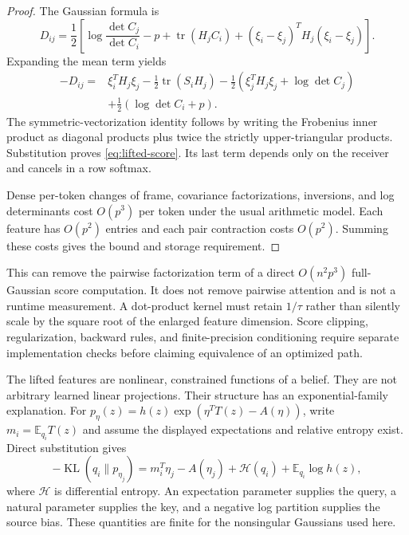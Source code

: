 \documentclass[11pt]{article}
\newcommand{\E}{\mathbb{E}}
\newcommand{\KL}{\operatorname{KL}}
\newcommand{\tr}{\operatorname{tr}}
\begin{document}
\begin{proof}
The Gaussian formula is
\begin{equation}
D_{ij}=\frac12\left[\log\frac{\det C_j}{\det C_i}-p+
\tr(H_jC_i)+(\xi_i-\xi_j)^TH_j(\xi_i-\xi_j)\right].
\end{equation}
Expanding the mean term yields
\begin{align}
-D_{ij}={}&\xi_i^TH_j\xi_j-\frac12\tr(S_iH_j)
-\frac12(\xi_j^TH_j\xi_j+\log\det C_j)\nonumber\\
&+\frac12(\log\det C_i+p).
\label{eq:expanded-gaussian}
\end{align}
The symmetric-vectorization identity follows by writing the Frobenius inner product as diagonal products plus twice the strictly upper-triangular products. Substitution proves \eqref{eq:lifted-score}. Its last term depends only on the receiver and cancels in a row softmax.

Dense per-token changes of frame, covariance factorizations, inversions, and log determinants cost $O(p^3)$ per token under the usual arithmetic model. Each feature has $O(p^2)$ entries and each pair contraction costs $O(p^2)$. Summing these costs gives the bound and storage requirement.
\end{proof}

This can remove the pairwise factorization term of a direct $O(n^2p^3)$ full-Gaussian score computation. It does not remove pairwise attention and is not a runtime measurement. A dot-product kernel must retain $1/\tau$ rather than silently scale by the square root of the enlarged feature dimension. Score clipping, regularization, backward rules, and finite-precision conditioning require separate implementation checks before claiming equivalence of an optimized path.

The lifted features are nonlinear, constrained functions of a belief. They are not arbitrary learned linear projections. Their structure has an exponential-family explanation. For $p_\eta(z)=h(z)\exp(\eta^TT(z)-A(\eta))$, write $m_i=\E_{q_i}T(z)$ and assume the displayed expectations and relative entropy exist. Direct substitution gives
\begin{equation}
-\KL(q_i\|p_{\eta_j})=m_i^T\eta_j-A(\eta_j)+\mathcal H(q_i)+\E_{q_i}\log h(z),
\label{eq:exponential-kl}
\end{equation}
where $\mathcal H$ is differential entropy. An expectation parameter supplies the query, a natural parameter supplies the key, and a negative log partition supplies the source bias. These quantities are finite for the nonsingular Gaussians used here.
\end{document}
